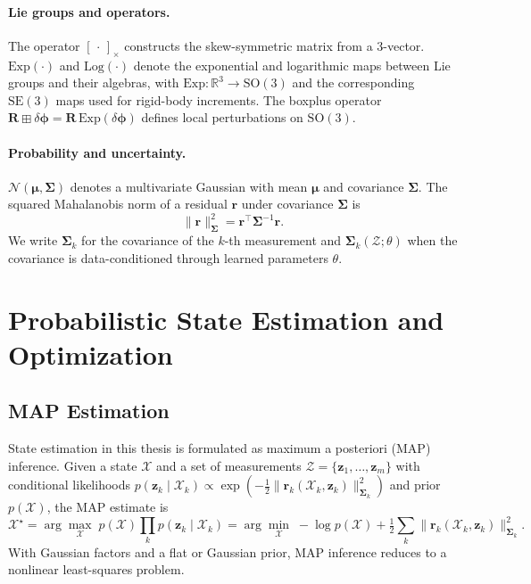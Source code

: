 \paragraph{Lie groups and operators.}
The operator $[\,\cdot\,]_\times$ constructs the skew-symmetric matrix from a 3-vector.
$\mathrm{Exp}(\cdot)$ and $\mathrm{Log}(\cdot)$ denote the exponential and logarithmic maps between Lie groups and their algebras, with $\mathrm{Exp}: \mathbb{R}^3 \to \mathrm{SO}(3)$ and the corresponding $\mathrm{SE}(3)$ maps used for rigid-body increments.
The boxplus operator $\mathbf{R} \boxplus \delta\bm{\phi} = \mathbf{R}\,\mathrm{Exp}(\delta\bm{\phi})$ defines local perturbations on $\mathrm{SO}(3)$.

\paragraph{Probability and uncertainty.}
$\mathcal{N}(\bm{\mu},\bm{\Sigma})$ denotes a multivariate Gaussian with mean $\bm{\mu}$ and covariance $\bm{\Sigma}$.
The squared Mahalanobis norm of a residual $\mathbf{r}$ under covariance $\bm{\Sigma}$ is
\begin{equation}
\label{eq:ch2:mahalanobis}
\|\mathbf{r}\|^2_{\bm{\Sigma}} = \mathbf{r}^{\top} \bm{\Sigma}^{-1} \mathbf{r}.
\end{equation}
We write $\bm{\Sigma}_k$ for the covariance of the $k$-th measurement and $\bm{\Sigma}_k(\mathcal{Z};\theta)$ when the covariance is data-conditioned through learned parameters $\theta$.

\section{Probabilistic State Estimation and Optimization}
\label{sec:ch2_estimation}

\subsection{MAP Estimation}
\label{sec:ch2_map}

State estimation in this thesis is formulated as maximum a posteriori (MAP) inference.
Given a state $\mathcal{X}$ and a set of measurements $\mathcal{Z} = \{\mathbf{z}_1,\dots,\mathbf{z}_m\}$ with conditional likelihoods $p(\mathbf{z}_k \mid \mathcal{X}_k) \propto \exp\!\left(-\tfrac{1}{2}\|\mathbf{r}_k(\mathcal{X}_k,\mathbf{z}_k)\|^2_{\bm{\Sigma}_k}\right)$ and prior $p(\mathcal{X})$, the MAP estimate is
\begin{equation}
\label{eq:ch2:map_general}
\mathcal{X}^{\star} = \arg\max_{\mathcal{X}} \; p(\mathcal{X}) \prod_{k} p(\mathbf{z}_k \mid \mathcal{X}_k)
        = \arg\min_{\mathcal{X}} \; - \log p(\mathcal{X}) + \tfrac{1}{2} \sum_{k} \|\mathbf{r}_k(\mathcal{X}_k,\mathbf{z}_k)\|^2_{\bm{\Sigma}_k}.
\end{equation}
With Gaussian factors and a flat or Gaussian prior, MAP inference reduces to a nonlinear least-squares problem.

